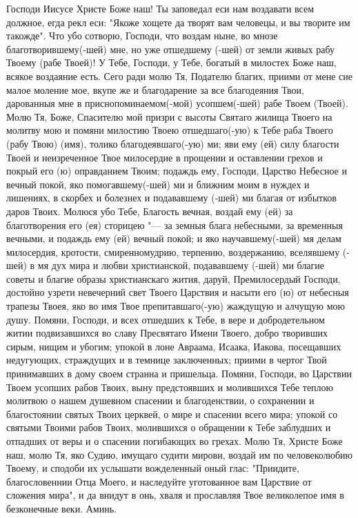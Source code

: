 Господи Иисусе Христе Боже наш! Ты заповедал еси нам воздавати всем должное, егда рекл еси: "Якоже хощете да творят вам человецы, и вы творите им такожде". Что убо сотворю, Господи, что воздам ныне, во мнозе благотворившему(-шей) мне, но уже отшедшему (-шей) от земли живых рабу Твоему (рабе Твоей)! У Тебе, Господи, у Тебе, богатый в милостех Боже наш, всякое воздаяние есть. Сего ради молю Тя, Подателю благих, приими от мене сие малое моление мое, вкупе же и благодарение за все благодеяния Твои, дарованныя мне в приснопоминаемом(-мой) усопшем(-шей) рабе Твоем (Твоей). Молю Тя, Боже, Спасителю мой призри с высоты Святаго жилища Твоего на молитву мою и помяни милостию Твоею отшедшаго(-ую) к Тебе раба Твоего (рабу Твою) (имя), толико благодеявшаго(-ую) ми; яви ему (ей) силу благости Твоей и неизреченное Твое милосердие в прощении и оставлении грехов и покрый его (ю) оправданием Твоим; подаждь ему, Господи, Царство Небесное и вечный покой, яко помогавшему(-шей) ми и ближним моим в нуждех и лишениях, в скорбех и болезнех и подававшему (-шей) ми благая от избытков даров Твоих. Молюся убо Тебе, Благость вечная, воздай ему (ей) за благотворения его (ея) сторицею "--- за земныя блага небесными, за временныя вечными, и подаждь ему (ей) вечный покой; и яко научавшему(-шей) мя делам милосердия, кротости, смиренномудрию, терпению, воздержанию, вселявшему (-шей) в мя дух мира и любви христианской, подававшему (-шей) ми благие советы и благие образы христианскаго жития, даруй, Премилосердый Господи, достойно узрети невечерний свет Твоего Царствия и насыти его (ю) от небесныя трапезы Твоея, яко во имя Твое препитавшаго(-ую) жаждущую и алчущую мою душу. Помяни, Господи, и всех отшедших к Тебе, в вере и добродетельном житии подвизавшихся во славу Пресвятаго Имени Твоего, добро творивших сирым, нищим и убогим; упокой в лоне Авраама, Исаака, Иакова, посещавших недугующих, страждущих и в темнице заключенных; приими в чертог Твой принимавших в дому своем странна и пришельца. Помяни, Господи, во Царствии Твоем усопших рабов Твоих, выну предстоявших и молившихся Тебе теплою молитвою о нашем душевном спасении и благоденствии, о сохранении и благостоянии святых Твоих церквей, о мире и спасении всего мира; упокой со святыми Твоими рабов Твоих, молившихся о обращении к Тебе заблудших и отпадших от веры и о спасении погибающих во грехах. Молю Тя, Христе Боже наш, молю Тя, яко Судию, имущаго судити мирови, воздай им по человеколюбию Твоему, и сподоби их услышати вожделенный оный глас: "Приидите, благословеннии Отца Моего, и наследуйте уготованное вам Царствие от сложения мира", и да внидут в онь, хваля и прославляя Твое великолепое имя в безконечные веки. Аминь. 


